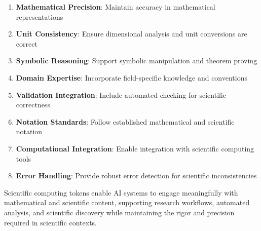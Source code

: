 \begin{enumerate}
\item \textbf{Mathematical Precision}: Maintain accuracy in mathematical representations
\item \textbf{Unit Consistency}: Ensure dimensional analysis and unit conversions are correct
\item \textbf{Symbolic Reasoning}: Support symbolic manipulation and theorem proving
\item \textbf{Domain Expertise}: Incorporate field-specific knowledge and conventions
\item \textbf{Validation Integration}: Include automated checking for scientific correctness
\item \textbf{Notation Standards}: Follow established mathematical and scientific notation
\item \textbf{Computational Integration}: Enable integration with scientific computing tools
\item \textbf{Error Handling}: Provide robust error detection for scientific inconsistencies
\end{enumerate}
\begin{comment}
Feedback: This list is good. To make it more actionable:
1.  **Mathematical Precision**: "When tokenizing mathematical formulas, use a canonical representation like LaTeX or MathML. This avoids ambiguity and provides a standardized format for the model to learn from."
2.  **Validation Integration**: "For generative tasks, don't just rely on the transformer's output. Pipe the generated formulas or equations into a symbolic math library (like SymPy) to validate their syntactic and semantic correctness. This can be used as a form of reinforcement learning or as a filter for invalid outputs."
3.  **Domain Expertise**: "When building your training data, use a parser to identify key scientific entities (e.g., chemical compounds, gene names, physical constants) and consider representing them with dedicated special tokens to ensure they are treated as single, indivisible concepts."
\end{comment}

Scientific computing tokens enable AI systems to engage meaningfully with mathematical and scientific content, supporting research workflows, automated analysis, and scientific discovery while maintaining the rigor and precision required in scientific contexts.
